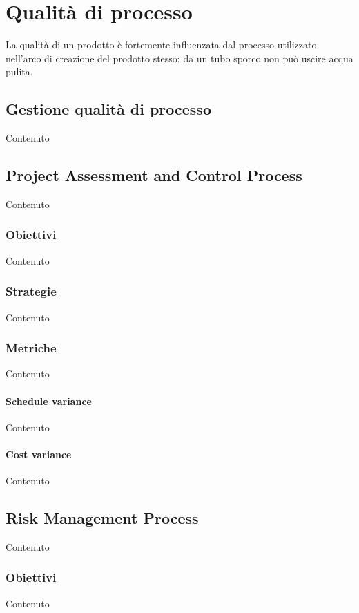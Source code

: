 \section{Qualit\`a di processo}\label{QualitaProcesso}
La qualità di un prodotto è fortemente influenzata dal processo utilizzato nell'arco di creazione del prodotto stesso:
da un tubo sporco non può uscire acqua pulita.

    \subsection{Gestione qualit\`a di processo}
    Contenuto


    \subsection{Project Assessment and Control Process}
    Contenuto
    
    \subsubsection{Obiettivi}
    Contenuto

    \subsubsection{Strategie}
    Contenuto


    \subsubsection{Metriche}
    Contenuto

    \paragraph{Schedule variance}
    Contenuto

    \paragraph{Cost variance}
    Contenuto


    \subsection{Risk Management Process}
    Contenuto

    \subsubsection{Obiettivi}
    Contenuto

